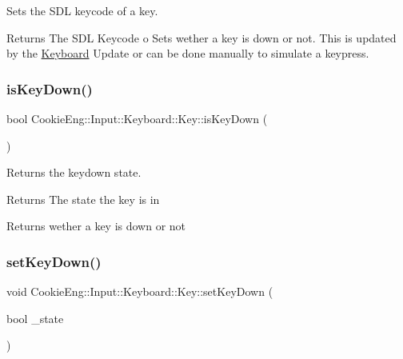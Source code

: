 Sets the S\+DL keycode of a key. 

\begin{DoxyReturn}{Returns}
The S\+DL Keycode o Sets wether a key is down or not. This is updated by the \hyperlink{class_cookie_eng_1_1_input_1_1_keyboard_1_1_keyboard}{Keyboard} Update or can be done manually to simulate a keypress. 
\end{DoxyReturn}
\mbox{\label{class_cookie_eng_1_1_input_1_1_keyboard_1_1_key_a2c0499cd43fea6c114114e176f5243ac}} 
\subsubsection{\texorpdfstring{is\+Key\+Down()}{isKeyDown()}}
{\footnotesize\ttfamily bool Cookie\+Eng\+::\+Input\+::\+Keyboard\+::\+Key\+::is\+Key\+Down (\begin{DoxyParamCaption}{ }\end{DoxyParamCaption})\hspace{0.3cm}{\ttfamily [inline]}}



Returns the keydown state. 

\begin{DoxyReturn}{Returns}
The state the key is in
\end{DoxyReturn}
Returns wether a key is down or not \mbox{\label{class_cookie_eng_1_1_input_1_1_keyboard_1_1_key_a27ba9abbd1fce1b29dff7e2cbb418223}} 
\subsubsection{\texorpdfstring{set\+Key\+Down()}{setKeyDown()}}
{\footnotesize\ttfamily void Cookie\+Eng\+::\+Input\+::\+Keyboard\+::\+Key\+::set\+Key\+Down (\begin{DoxyParamCaption}\item[{bool}]{\+\_\+state }\end{DoxyParamCaption})\hspace{0.3cm}{\ttfamily [inline]}}



